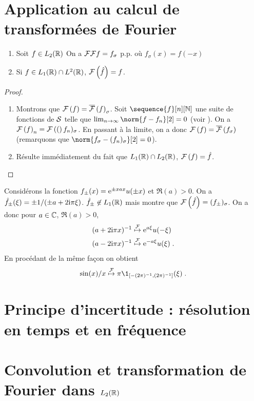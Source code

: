 \section{Application au calcul de transform\'ees de Fourier}
\begin{proposition}
\label{prop:calcul}
\begin{enumerate}[label=(\roman*)]
\item Soit $f \in L_2(\mathbb{R})$ On a $\mathcal{F} \mathcal{F} f = f_\sigma$ p.p. o\`u $f_\sigma(x)= f(-x)$
\item Si $f \in L_1(\mathbb{R}) \cap L^2(\mathbb{R})$, $\mathcal{F}\left( \hat{f} \right) = f$.
\end{enumerate}
\end{proposition}
\begin{proof}
\begin{enumerate}[label=(\roman*), wide=0pt, labelindent=\parindent]
\item Montrons que $\mathcal{F}\left( f \right) = \overline{\mathcal{F}}\left( f \right)_\sigma$. Soit $\sequence{f}[n][\nset]$ une suite de fonctions de $\mathcal{S}$ telle que
$\lim_{n \to \infty} \norm{f-f_n}[2]=0$ (voir ). On a $\mathcal{F}\left( f \right)_n = \mathcal{F}\left( ( \right)f_n)_\sigma$. En passant \`{a} la limite, on a donc $\mathcal{F}\left( f \right)= \overline{\mathcal{F}}\left( f_\sigma \right)$ (remarquons que $\norm{f_\sigma - (f_n)_\sigma}[2]=0$).
\item R\'esulte imm\'ediatement du fait que $L_1(\mathbb{R}) \cap L_2(\mathbb{R})$, $\mathcal{F}\left( f \right) = \hat{f}$.
\end{enumerate}
\end{proof}
\begin{example}
Consid\'erons la fonction $f_\pm(x)= \mathrm{e}^{\pm x a x} u(\pm x)$ et $\Re(a) >0$. On a $\hat{f}_{\pm}(\xi)= \pm 1 / (\pm a + 2 \mathrm{i} \pi \xi)$. $\hat{f}_{\pm} \not \in L_1(\mathbb{R})$ mais  montre que $\mathcal{F}\left( \hat{f} \right)= (f_{\pm})_\sigma$. On a donc
pour $a \in \mathbb{C}$, $\Re(a) > 0$,
\begin{align*}
(a + 2 \mathrm{i} \pi x)^{-1} &\stackrel{\mathcal{F}}{\mapsto} \mathrm{e}^{a \xi} u(-\xi) \\
(a - 2 \mathrm{i} \pi x)^{-1} &\stackrel{\mathcal{F}}{\mapsto} \mathrm{e}^{-a \xi} u(\xi) \;.
\end{align*}
En proc\'edant de la m\^{e}me fa\c{c}on on obtient
\[
\sin(x) / x \TFyield \pi \1_{\ccint{-(2\pi)^{-1},(2 \pi)^{-1}}} (\xi) \eqsp.
\]
\end{example}
\section{Principe d'incertitude : r\'esolution en temps et en fr\'equence}

\section{Convolution et transformation de Fourier dans $L_2(\mathbb{R})$}

